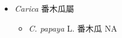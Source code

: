 
  \begin{itemize}
 \item[] \textit{Carica} 番木瓜屬
                                
  \begin{itemize}
        \item[] \textit{C. papaya} L.  番木瓜   NA
  \end{itemize}
  \end{itemize}
